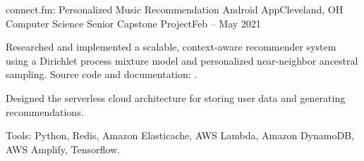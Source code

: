 \begin{ritemize}
{connect.fm: Personalized Music Recommendation Android App}{Cleveland, OH}
{Computer Science Senior Capstone Project}{Feb -- May 2021}
	\item Researched and implemented a scalable, context-aware recommender system using a Dirichlet process mixture model and personalized near-neighbor ancestral sampling. Source code and documentation: .
	\item Designed the serverless cloud architecture for storing user data and generating recommendations.
	\item Tools: Python, Redis, Amazon Elasticache, AWS Lambda, Amazon DynamoDB, AWS Amplify, Tensorflow.
\end{ritemize}